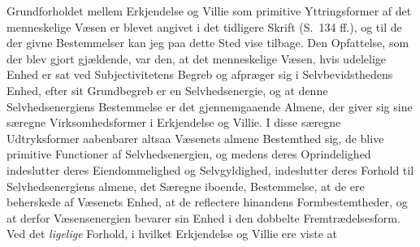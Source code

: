 %
Grundforholdet mellem Erkjendelse og Villie som primitive Yttringsformer af
det menneskelige Væsen er blevet angivet i det tidligere Skrift (S.\ 134 ff.),
og til de der givne Bestemmelser kan jeg paa dette Sted vise tilbage. Den
Opfattelse, som der blev gjort gjældende, var den, at det menneskelige Væsen,
hvis udelelige Enhed er sat ved Subjectivitetens Begreb og afpræger sig i
Selvbevidsthedens Enhed, efter sit Grundbegreb er en Selvhedsenergie, og at
denne Selvhedsenergiens Bestemmelse er det gjennemgaaende Almene, der giver
sig sine særegne Virksomhedsformer i Erkjendelse og Villie. I disse særegne
Udtryksformer aabenbarer altsaa Væsenets almene Bestemthed sig, de blive
primitive Functioner af Selvhedsenergien, og medens deres Oprindelighed
indeslutter deres Eiendommelighed og Selvgyldighed, indeslutter deres Forhold
til Selvhedsenergiens almene, det Særegne iboende, Bestemmelse, at de ere
beherskede af Væsenets Enhed, at de reflectere hinandens Formbestemtheder, og
at derfor Væsensenergien bevarer sin Enhed i den dobbelte Fremtrædelsesform.
Ved det \emph{ligelige} Forhold, i hvilket Erkjendelse og Villie ere viste at
